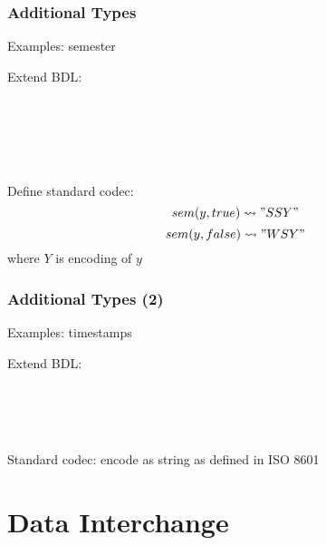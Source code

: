 \begin{frame}\frametitle{Additional Types}
Examples: semester

Extend BDL:
\begin{commgrammar}
\\
\\
\\
\\
\end{commgrammar}

Define standard codec:
\[sem(y,true) \rightsquigarrow "SSY"\]
\[sem(y,false) \rightsquigarrow "WSY"\]
where $Y$ is encoding of $y$
\end{frame}

\begin{frame}\frametitle{Additional Types (2)}
Examples: timestamps

Extend BDL:
\begin{commgrammar}
\\
\\
\\
\end{commgrammar}

Standard codec: encode as string as defined in ISO 8601
\end{frame}

\section{Data Interchange}

